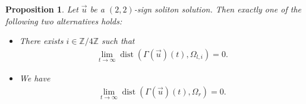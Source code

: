 \documentclass[10pt,a4paper]{amsart}
\newtheorem{proposition}[theorem]{Proposition}
\numberwithin{equation}{section}
\begin{document}
\begin{proposition}\label{2,2fullconv1}
Let $\vec{u}$ be a $(2,2)$-sign soliton solution. Then exactly one of the following two alternatives holds:
\begin{itemize}
\item There exists $i\in \mathbb{Z}/4\mathbb{Z}$ such that 
\begin{align}\label{shuugoukyoku1}
\lim_{t\to\infty}\operatorname{dist}(\Gamma(\vec{u})(t),\Omega_{l,i})=0.
\end{align}

\item We have
\begin{align}\label{shuugoukyoku2}
\lim_{t\to\infty}\operatorname{dist}(\Gamma(\vec{u})(t),\Omega_r)=0.
\end{align}
\end{itemize}
\end{proposition}
\end{document}
